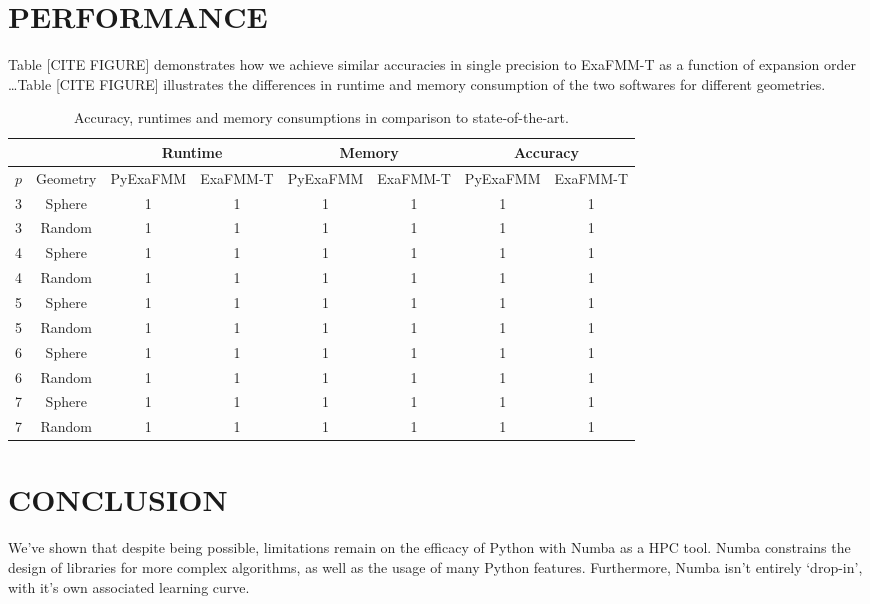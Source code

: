 \documentclass{IEEEcsmag}
\begin{document}
\section{PERFORMANCE}

Table [CITE FIGURE] demonstrates how we achieve similar accuracies in single precision to ExaFMM-T as a function of expansion order \dots Table [CITE FIGURE] illustrates the differences in runtime and memory consumption of the two softwares for different geometries.

\begin{table}[t]
	\centering
	\caption{Accuracy, runtimes and memory consumptions in comparison to state-of-the-art.}
	\begin{tabular}{|*{8}{c|}}
		\hline
		&  & \multicolumn{2}{c|}{Runtime} & \multicolumn{2}{c|}{Memory} & \multicolumn{2}{c|}{Accuracy}\\
		\hline
		$p$ &  Geometry   &   PyExaFMM  &  ExaFMM-T &    PyExaFMM  &  ExaFMM-T  &   PyExaFMM  &  ExaFMM-T\\
		\hline
		3   &   Sphere  &  1 &    1  &  1  &   1  & 1 & 1\\
		3   &   Random  &  1 &    1  &  1  &   1  & 1 & 1\\
		4   &   Sphere  &  1 &    1  &  1  &   1  & 1 & 1\\
		4   &   Random  &  1 &    1  &  1  &   1  & 1 & 1\\
		5   &   Sphere  &  1 &    1  &  1  &   1  & 1 & 1\\
		5   &   Random  &  1 &    1  &  1  &   1  & 1 & 1\\
		6   &   Sphere  &  1 &    1  &  1  &   1  & 1 & 1\\
		6   &   Random  &  1 &    1  &  1  &   1  & 1 & 1\\
		7   &   Sphere  &  1 &    1  &  1  &   1  & 1 & 1\\
		7   &   Random  &  1 &    1  &  1  &   1  & 1 & 1\\
		\hline
	\end{tabular}
	\label{tab:performance}
 \end{table}
\section{CONCLUSION}

We've shown that despite being possible, limitations remain on the efficacy of Python with Numba as a HPC tool. Numba constrains the design of libraries for more complex algorithms, as well as the usage of many Python features. Furthermore, Numba isn't entirely `drop-in', with it's own associated learning curve.
\end{document}
